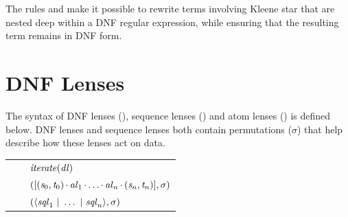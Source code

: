 \documentclass[acmsmall]{acmart}
\begin{document}
The rules \AtomStructuralRewriteRule{} and \DNFStructuralRewriteRule{}
make it possible to rewrite terms involving Kleene star that are
nested deep within a DNF regular expression, while ensuring that the
resulting term remains in DNF form.


\section{DNF Lenses}
\label{sec:dnf}

The syntax of DNF lenses (\DNFLens{}),
sequence lenses (\SequenceLens{})
and atom lenses (\AtomLens{}) is defined below. DNF lenses and
sequence lenses both contain permutations ($\sigma$) that help
describe how these lenses act on data.
\begin{center}
  \begin{tabular}{@{}r@{\ }c@{}l@{}}
    \AtomLens{} & \GEq{} & $\mathit{\mathit{iterate}(\mathit{dl})}$ \\
    \SequenceLens{} & \GEq{} & $([(\mathit{s}_0,\mathit{t}_0)\mkern-1mu\cdot\mkern-1mu\mathit{al}_1\mkern-1mu\cdot\mkern-1mu\ldots\mkern-1mu\cdot\mkern-1mu\mathit{al}_n\mkern-1mu\cdot\mkern-1mu(\mathit{s}_n,\mathit{t}_n)],\sigma)$ \\
    \DNFLens{} & \GEq{} & $(\langle\mathit{sql}_1~|~\ldots~|~\mathit{sql}_n\rangle, \sigma)$ \\
  \end{tabular}
\end{center}
\end{document}
